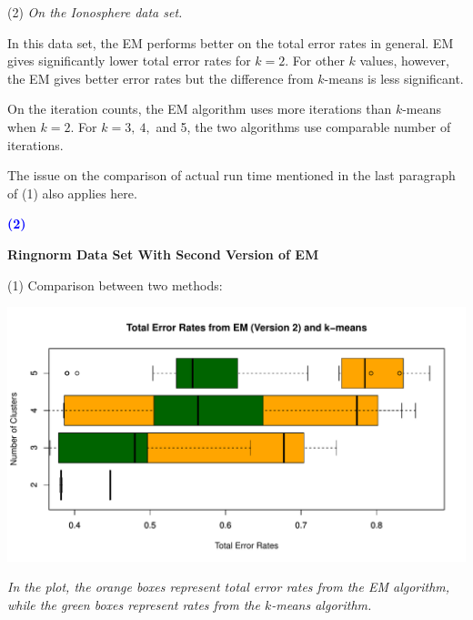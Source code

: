 \documentclass[a4paper,12pt]{article}
\newcommand{\qnum}[1]{\noindent\textcolor{blue}{\textbf{(#1)}}}
\newcommand{\km}{$k$-means }
\begin{document}
\noindent 
(2) \emph{On the Ionosphere data set.}

In this data set, the EM performs better on the total error rates in general. EM gives significantly lower total error rates for $k=2$. For other $k$ values, however, the EM gives better error rates but the difference from \km is less significant.

On the iteration counts, the EM algorithm uses more iterations than $k$-means when $k=2$. For $k=3,\ 4,$ and 5, the two algorithms use comparable number of iterations.

The issue on the comparison of actual run time mentioned in the last paragraph of (1) also applies here.
\bigskip\bigskip




\qnum{2}
\begin{center}
    \textcolor{mydarkgreen}{\textbf{Ringnorm Data Set With Second Version of EM}}
\end{center}
\vspace{10pt}

\noindent (1) Comparison between two methods:

\begin{center}
  \includegraphics[width=0.9\linewidth]{Image/Prob3-2-TotalErr-Ringnorm-Both.pdf}
  
   \parbox{0.9\textwidth}{\textit{In the plot, the \textcolor{myorange}{orange boxes} represent total error rates from the EM algorithm, while the \textcolor{mydarkgreen}{green boxes} represent rates from the $k$-means algorithm.
  }}
\end{center}
\bigskip
\end{document}
